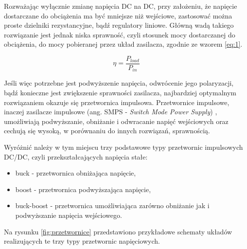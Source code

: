 Rozważając wyłącznie zmianę napięcia DC na DC, przy założeniu, że napięcie dostarczane do obciążenia ma być mniejsze niż wejściowe, zastosować można proste dzielniki rezystancyjne, bądź regulatory liniowe.
Główną wadą takiego rozwiązanie jest jednak niska sprawność, czyli stosunek mocy dostarczanej do obciążenia, do mocy pobieranej przez układ zasilacza, zgodnie ze wzorem \ref{eq:1}.

\begin{equation}
    \label{eq:1}
    \eta = \frac{P_{load}}{P_{in}}
\end{equation}

Jeśli więc potrzebne jest podwyższenie napięcia, odwrócenie jego polaryzacji, bądź konieczne jest zwiększenie sprawności zasilacza, najbardziej optymalnym rozwiązaniem okazuje się przetwornica impulsowa.
Przetwornice impulsowe, inaczej zasilacze impulsowe (ang. SMPS - \textit{Switch Mode Power Supply}) \cite{zasilaczeImpulsowe}, umożliwiają podwyższanie, obniżanie i odwracanie napięć wejściowych oraz cechują się wysoką, w porównaniu do innych rozwiązań, sprawnością.

Wyróżnić należy w tym miejscu trzy podstawowe typy przetwornic impulsowych DC/DC, czyli przekształcających napięcia stałe:

\begin{itemize}
    \item buck - przetwornica obniżająca napięcie,
    \item boost - przetwornica podwyższająca napięcie,
    \item buck-boost - przetwornica umożliwiająca zarówno obniżanie jak i podwyższanie napięcia wejściowego.
\end{itemize}

Na rysunku \ref{fig:przetwornice} przedstawiono przykładowe schematy układów realizujących te trzy typy przetwornic napięciowych.

